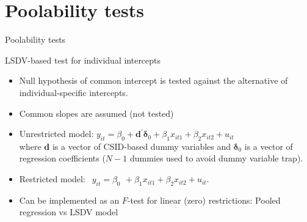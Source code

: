 \documentclass{beamer}
\begin{document}
\section{Poolability tests}
\begin{frame}{Poolability tests}
\end{frame}
\begin{frame}{LSDV-based test for individual intercepts}
\begin{itemize}
    \item Null hypothesis of common intercept is tested against the alternative of individual-specific intercepts.
    \medskip
    \item Common slopes are assumed (not tested)
    \medskip
    \item Unrestricted model: $y_{it} = \beta_{0} + \bm{d}^{\prime}\bm{\delta}_{0} + \beta_1 x_{it1} + \beta_2 x_{it2} + u_{it}$ \\ 
    where $\bm{d}$ is a vector of CSID-based dummy variables and $\bm{\delta}_{0}$ is a vector of regression coefficients ($N-1$ dummies used to avoid dummy variable trap).
    \medskip
    \item Restricted model: $~~y_{it} = \beta_{0}~ \, + \beta_1 x_{it1} + \beta_2 x_{it2} + u_{it}$.
    \medskip
    \item Can be implemented as an $F$-test for linear (zero) restrictions: Pooled regression vs LSDV model
\end{itemize}
\end{frame}
\end{document}
